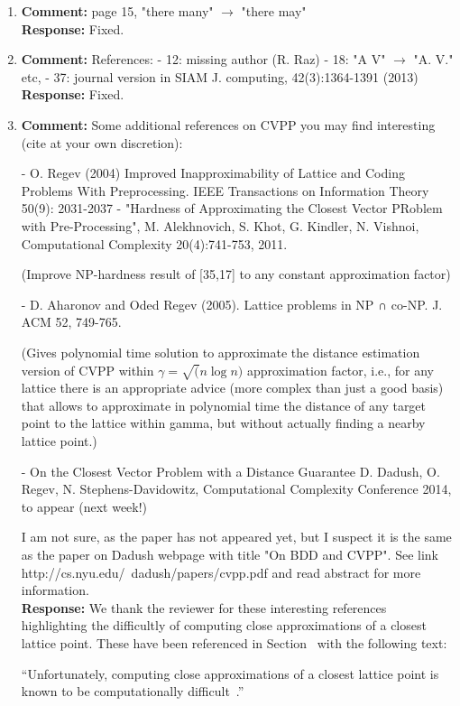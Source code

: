 \documentclass[a4paper,10pt]{article}
\begin{document}
\begin{enumerate}
\item\textbf{Comment:}  
page 15, "there many" $\to$ "there may" 
\\\textbf{Response:}
Fixed.

\item\textbf{Comment:}  
References: 
- 12: missing author (R. Raz) 
- 18: "A V" $\to$ "A. V." etc, 
- 37: journal version in SIAM J. computing, 42(3):1364-1391 (2013) 
\\\textbf{Response:}
Fixed.

\item\textbf{Comment:}  
Some additional references on CVPP you may find interesting 
(cite at your own discretion): 

- O. Regev (2004) Improved Inapproximability of Lattice and Coding Problems With Preprocessing. IEEE Transactions on Information Theory 50(9): 2031-2037 
- "Hardness of Approximating the Closest Vector PRoblem with Pre-Processing", M. Alekhnovich, S. Khot, G. Kindler, N. Vishnoi, Computational Complexity 20(4):741-753, 2011. 

(Improve NP-hardness result of [35,17] to any constant approximation factor) 

- D. Aharonov and Oded Regev (2005). Lattice problems in NP ∩ co-NP. J. ACM 52, 749-765. 

(Gives polynomial time solution to approximate the distance estimation version of CVPP within $\gamma=\sqrt(n \log n)$ approximation factor, i.e., for any lattice there is an appropriate advice (more complex than just a good basis) that allows to approximate in polynomial time the distance of any target point to the lattice within gamma, but without actually finding a nearby lattice point.) 

- On the Closest Vector Problem with a Distance Guarantee 
D. Dadush, O. Regev, N. Stephens-Davidowitz, Computational Complexity Conference 2014, to appear (next week!) 

I am not sure, as the paper has not appeared yet, but I suspect it is the same as the paper on Dadush webpage with title "On BDD and CVPP". 
See link 
http://cs.nyu.edu/~dadush/papers/cvpp.pdf 
and read abstract for more information.
\\\textbf{Response:}
We thank the reviewer for these interesting references highlighting the difficultly of computing close approximations of a closest lattice point.  These have been referenced in Section~ with the following text:

``Unfortunately, computing close approximations of a closest lattice point is known to be computationally difficult~\cite{feige_inapproximability_2004,Regev_2004_inappox_lattice_with_preprocessing,Aharonov_Regev_2005,Aleknovish_hardness_with_preprocessing_2011,Dadush_cvp_with_distance_guarantee_2014}.''

\end{enumerate}




%

\end{document}
